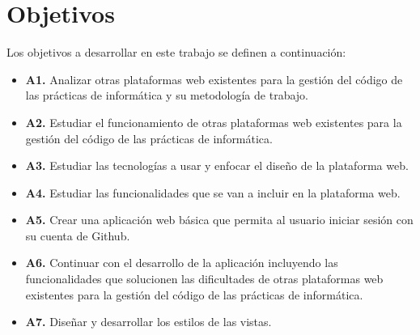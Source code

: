 
\section{Objetivos}
\label{2:sec:1}

Los objetivos a desarrollar en este trabajo se definen a continuación:

\begin{itemize}
  \item {\bf A1.} Analizar otras plataformas  web existentes para la gestión del código de las prácticas de informática y su metodología de trabajo.
  \item {\bf A2.} Estudiar el funcionamiento de otras plataformas  web existentes para la gestión del código de las prácticas de informática.
  \item {\bf A3.} Estudiar las tecnologías a usar y enfocar el diseño de la plataforma web.
  \item {\bf A4.} Estudiar las funcionalidades que se van a incluir en la plataforma web.
  \item {\bf A5.} Crear una aplicación web básica que permita al usuario iniciar sesión con su cuenta de Github.
  \item {\bf A6.} Continuar con el desarrollo de la aplicación incluyendo las funcionalidades que solucionen las dificultades de otras plataformas  web existentes para la gestión del código de las prácticas de informática.
  \item {\bf A7.} Diseñar y desarrollar los estilos de las vistas.
\end{itemize}

